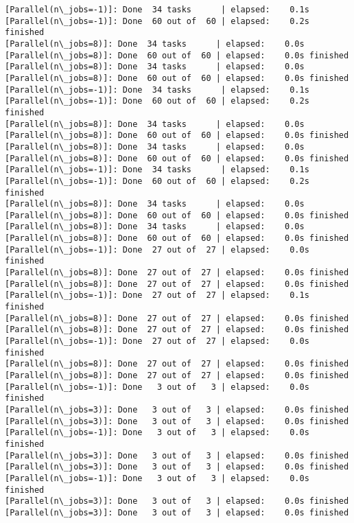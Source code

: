 \documentclass[11pt]{article}
\begin{document}
    \begin{Verbatim}[commandchars=\\\{\}]
[Parallel(n\_jobs=-1)]: Done  34 tasks      | elapsed:    0.1s
[Parallel(n\_jobs=-1)]: Done  60 out of  60 | elapsed:    0.2s finished
[Parallel(n\_jobs=8)]: Done  34 tasks      | elapsed:    0.0s
[Parallel(n\_jobs=8)]: Done  60 out of  60 | elapsed:    0.0s finished
[Parallel(n\_jobs=8)]: Done  34 tasks      | elapsed:    0.0s
[Parallel(n\_jobs=8)]: Done  60 out of  60 | elapsed:    0.0s finished
[Parallel(n\_jobs=-1)]: Done  34 tasks      | elapsed:    0.1s
[Parallel(n\_jobs=-1)]: Done  60 out of  60 | elapsed:    0.2s finished
[Parallel(n\_jobs=8)]: Done  34 tasks      | elapsed:    0.0s
[Parallel(n\_jobs=8)]: Done  60 out of  60 | elapsed:    0.0s finished
[Parallel(n\_jobs=8)]: Done  34 tasks      | elapsed:    0.0s
[Parallel(n\_jobs=8)]: Done  60 out of  60 | elapsed:    0.0s finished
[Parallel(n\_jobs=-1)]: Done  34 tasks      | elapsed:    0.1s
[Parallel(n\_jobs=-1)]: Done  60 out of  60 | elapsed:    0.2s finished
[Parallel(n\_jobs=8)]: Done  34 tasks      | elapsed:    0.0s
[Parallel(n\_jobs=8)]: Done  60 out of  60 | elapsed:    0.0s finished
[Parallel(n\_jobs=8)]: Done  34 tasks      | elapsed:    0.0s
[Parallel(n\_jobs=8)]: Done  60 out of  60 | elapsed:    0.0s finished
[Parallel(n\_jobs=-1)]: Done  27 out of  27 | elapsed:    0.0s finished
[Parallel(n\_jobs=8)]: Done  27 out of  27 | elapsed:    0.0s finished
[Parallel(n\_jobs=8)]: Done  27 out of  27 | elapsed:    0.0s finished
[Parallel(n\_jobs=-1)]: Done  27 out of  27 | elapsed:    0.1s finished
[Parallel(n\_jobs=8)]: Done  27 out of  27 | elapsed:    0.0s finished
[Parallel(n\_jobs=8)]: Done  27 out of  27 | elapsed:    0.0s finished
[Parallel(n\_jobs=-1)]: Done  27 out of  27 | elapsed:    0.0s finished
[Parallel(n\_jobs=8)]: Done  27 out of  27 | elapsed:    0.0s finished
[Parallel(n\_jobs=8)]: Done  27 out of  27 | elapsed:    0.0s finished
[Parallel(n\_jobs=-1)]: Done   3 out of   3 | elapsed:    0.0s finished
[Parallel(n\_jobs=3)]: Done   3 out of   3 | elapsed:    0.0s finished
[Parallel(n\_jobs=3)]: Done   3 out of   3 | elapsed:    0.0s finished
[Parallel(n\_jobs=-1)]: Done   3 out of   3 | elapsed:    0.0s finished
[Parallel(n\_jobs=3)]: Done   3 out of   3 | elapsed:    0.0s finished
[Parallel(n\_jobs=3)]: Done   3 out of   3 | elapsed:    0.0s finished
[Parallel(n\_jobs=-1)]: Done   3 out of   3 | elapsed:    0.0s finished
[Parallel(n\_jobs=3)]: Done   3 out of   3 | elapsed:    0.0s finished
[Parallel(n\_jobs=3)]: Done   3 out of   3 | elapsed:    0.0s finished

\end{Verbatim}
\end{document}
